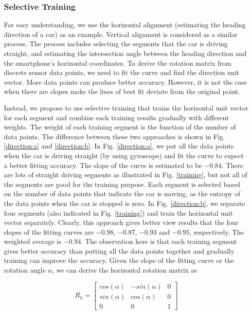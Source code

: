 \subsubsection{Selective Training}
\label{selectivetraining}
For easy understanding, we use the horizontal alignment (estimating
the heading direction of a car) as an example.
Vertical alignment is considered as a similar process.  
The process includes selecting the segments that the car is driving
straight, and estimating the intersection angle between the heading direction and the smartphone's horizontal coordinates. 
To derive the rotation matrix from discrete sensor data points, 
we need to fit the curve and find the direction unit vector. 
More data points can produce better accuracy. 
However, it is not the case when there are slopes 
make the lines of best fit deviate from the original point. 


Instead, we propose to use selective training that trains the horizontal
unit vector for each segment and combine each training results gradually with different weights.
The weight of each training segment is the function of the number of data points. 
The difference between these two approaches is shown in Fig. \ref{direction:a} and \ref{direction:b}. 
In Fig. \ref{direction:a}, we put all the data points when the car is driving 
straight (by using gyroscope) and fit the curve to expect a better
fitting accuracy. 
The slope of the curve is estimated to be $-0.84$. 
There are lots of straight driving segments as illustrated in Fig. \ref{training}, 
but not all of the segments are good for the training purpose. 
Each segment is selected based on the number of data points that
indicate the car is moving, 
as the entropy of the data points when the car is stopped is zero.   
In Fig. \ref{direction:b}, we separate four segments (also indicated 
in Fig. \ref{training}) and train the 
horizontal unit vector separately.
Clearly, this approach gives better view results that the four slopes of the 
fitting curves are $-0.98$, $-0.87$, $-0.93$ and $-0.95$, respectively. 
The weighted average is $-0.94$. 
The observation here is that each training segment gives better accuracy than
putting all the data points together and gradually training can improve the accuracy. 
Given the slope of the fitting curve or the rotation angle $\alpha$, 
we can derive the horizontal rotation matrix as

\[
R_h
	=
\begin{bmatrix}
   cos(\alpha) & -sin(\alpha) & 0 \\
   sin(\alpha) & cos(\alpha) & 0 \\
   0 & 0 & 1
\end{bmatrix}
\]



